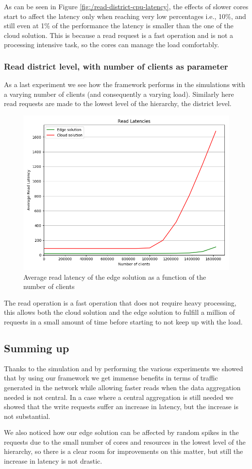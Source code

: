 As can be seen in Figure \ref{fig:/read-district-cpu-latency}, the effects of slower cores start to affect the latency only when reaching very low percentages i.e., 10\%, and still even at 1\% of the performance the latency is smaller than the one of the cloud solution. This is because a read request is a fast operation and is not a processing intensive task, so the cores can manage the load comfortably.

\subsubsection{Read district level, with number of clients as parameter}
As a last experiment we see how the framework performs in the simulations with a varying number of clients (and consequently a varying load).
Similarly here read requests are made to the lowest level of the hierarchy, the district level.

\begin{figure}[H]
    \centering
    \includegraphics[width=0.86\linewidth]{Figures/Evaluation/read-district-clients-latency.png}
    \caption{Average read latency of the edge solution as a function of the number of clients}
    \label{fig:/read-district-clients-latency}
\end{figure}

The read operation is a fast operation that does not require heavy processing, this allows both the cloud solution and the edge solution to fulfill a million of requests in a small amount of time before starting to not keep up with the load.

\subsection{Summing up}
Thanks to the simulation and by performing the various experiments we showed that by using our framework we get immense benefits in terms of traffic generated in the network while allowing faster reads when the data aggregation needed is not central.
In a case where a central aggregation is still needed we showed that the write requests suffer an increase in latency, but the increase is not substantial.

We also noticed how our edge solution can be affected by random spikes in the requests due to the small number of cores and resources in the lowest level of the hierarchy, so there is a clear room for improvements on this matter, but still the increase in latency is not drastic.


